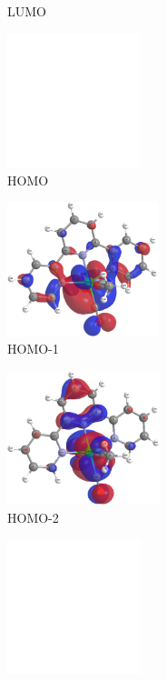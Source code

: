 \begin{figure}[!ht]
\begin{subfigure}[b]{0.31\textwidth}
  \caption{LUMO}
 \end{subfigure}
 \begin{subfigure}[b]{0.31\textwidth}
  \includegraphics[clip=true, width=\textwidth, height=39mm, keepaspectratio]{images/mos/8h.eps}
  \caption{HOMO}
 \end{subfigure}
 \begin{subfigure}[b]{0.31\textwidth}
  \includegraphics[clip=true, width=\textwidth, height=39mm, keepaspectratio]{images/mos/8h-1.eps}
  \caption{HOMO-1}
 \end{subfigure}
 \begin{subfigure}[b]{0.31\textwidth}
  \includegraphics[clip=true, width=\textwidth, height=39mm, keepaspectratio]{images/mos/8h-2.eps}
  \caption{HOMO-2}
 \end{subfigure}
 \begin{subfigure}[b]{0.31\textwidth}
  \includegraphics[clip=true, width=\textwidth, height=39mm, keepaspectratio]{images/mos/8h-3.eps}

\end{subfigure}
\end{figure}
